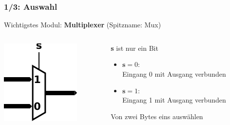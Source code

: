 \documentclass[t,aspectratio=169,usenames,dvipsnames]{beamer}
\begin{document}
\begin{frame}
  \frametitle{1/3: Auswahl}

  Wichtigstes Modul: \textbf{Multiplexer} (Spitzname: Mux)

  \begin{columns}
    \begin{column}{.45\textwidth}
      \begin{center}
        \includegraphics[width=.8\textwidth]{multiplexer.pdf}
      \end{center}
    \end{column}
    \begin{column}{.45\textwidth}

      \textbf{s} ist nur ein Bit
      \begin{itemize}
      \item $\mathbf{s} = 0$:\\
        Eingang 0 mit Ausgang verbunden
      \item $\mathbf{s} = 1$:\\
        Eingang 1 mit Ausgang verbunden
      \end{itemize}

      \bigskip

      Von zwei Bytes eins auswählen

    \end{column}
  \end{columns}
\end{frame}
\end{document}
